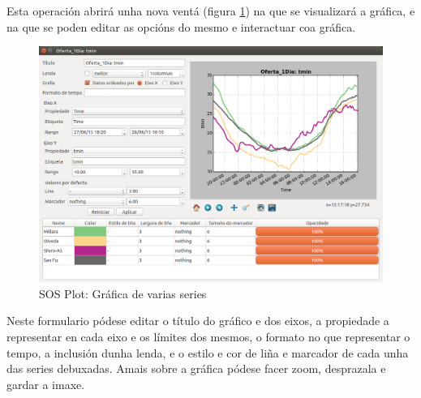 Esta operación abrirá unha nova ventá (figura \ref{fig:sosplot}) na que se visualizará a gráfica, e na que se poden editar as opcións do mesmo e interactuar coa gráfica.

\begin{figure}[hbtp]
\centering
\includegraphics[width=\textwidth]{images/manual/sosplot.png}
\caption{SOS Plot: Gráfica de varias series}
\label{fig:sosplot}
\end{figure}

Neste formulario pódese editar o título do gráfico e dos eixos, a propiedade a representar en cada eixo e os límites dos mesmos, o formato no que representar o tempo, a inclusión dunha lenda, e o estilo e cor de liña e marcador de cada unha das series debuxadas. Amais sobre a gráfica pódese facer zoom, desprazala e gardar a imaxe.